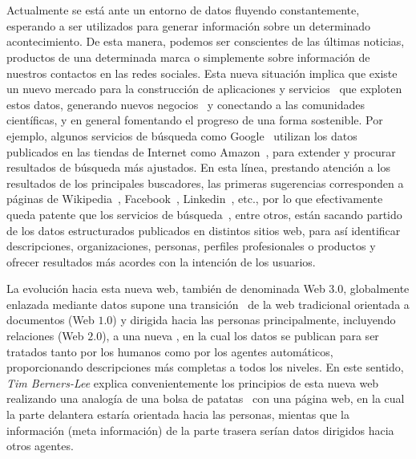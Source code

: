 \section{\linkeddata}
Actualmente se está ante un entorno de datos fluyendo constantemente, esperando a ser utilizados para generar información
sobre un determinado acontecimiento. De esta manera, podemos ser conscientes de las últimas noticias, productos de una determinada
marca o simplemente sobre información de nuestros contactos en las redes sociales. Esta nueva situación implica que existe un nuevo
mercado para la construcción de aplicaciones y servicios~\cite{Krafzig2004} que exploten estos datos, generando nuevos negocios~\cite{web20} y conectando a las comunidades
científicas, y en general fomentando el progreso de una forma sostenible. Por ejemplo, algunos servicios de búsqueda como Google~\cite{Google} utilizan los
datos publicados en las tiendas de Internet como Amazon~\cite{Amazon}, para extender y procurar resultados de búsqueda más ajustados. En esta línea, prestando 
atención a los resultados de los principales buscadores, las primeras sugerencias corresponden a páginas de Wikipedia~\cite{Wikipedia}, Facebook~\cite{Facebook},
 Linkedin~\cite{Linkedin}, etc.,  por lo que efectivamente queda patente que los servicios de búsqueda~\cite{Pound}, entre otros, están sacando partido de los datos estructurados publicados en distintos sitios web, para así identificar descripciones, organizaciones, personas, perfiles profesionales o productos y 
ofrecer resultados más acordes con la intención de los usuarios.

La evolución hacia esta nueva web, también de denominada Web $3.0$, globalmente enlazada mediante datos supone una transición~\cite{Ankolekar07thetwo}
de la web tradicional orientada a documentos (Web $1.0$) y dirigida hacia las personas principalmente, incluyendo relaciones (Web $2.0$),
a una nueva \wode, en la cual los datos se publican para ser tratados tanto por los humanos como
por los agentes automáticos, proporcionando descripciones más completas a todos los niveles. En este
sentido, \textit{Tim Berners-Lee} explica convenientemente los principios de esta nueva web realizando una analogía 
de una bolsa de patatas~\cite{TBL-crisps} con una página web, en la cual la parte delantera estaría orientada 
hacia las personas, mientas que la información (meta información) de la parte trasera serían datos
dirigidos hacia otros agentes.

